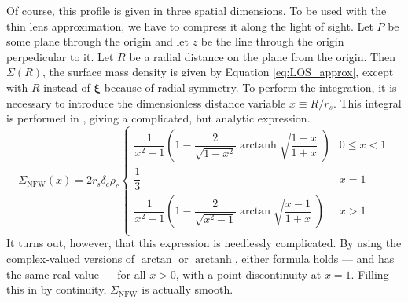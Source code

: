 \documentclass[10pt,twoside]{article}
\theoremstyle{definition}
\theoremstyle{exercise}
\renewcommand{\v}[1]{\boldsymbol{#1}}%
\DeclareMathOperator\arctanh{arctanh}
\begin{document}
Of course, this profile is given in three spatial dimensions. To be used with the thin lens approximation, we have to compress it along the light of sight. Let $P$ be some plane through the origin and let $z$ be the line through the origin perpedicular to it. Let $R$ be a radial distance on the plane from the origin. Then $\Sigma(R)$, the surface mass density is given by Equation \eqref{eq:LOS_approx}, except with $R$ instead of $\v{\xi}$ because of radial symmetry. To perform the integration, it is necessary to introduce the dimensionless distance variable $x \equiv R/r_s$. This integral is performed in \cite{brainerd_wright}, giving a complicated, but analytic expression.
\begin{equation}
		\Sigma_\text{NFW}(x) = 2r_s \delta_c \rho_c
		\begin{cases}
				\dfrac{1}{x^2-1}\left( 1-\dfrac{2}{\sqrt{1-x^2}} \arctanh \sqrt{\dfrac{1-x}{1+x}}\; \right) & 0 \le x < 1\\[1.2em]
				\dfrac{1}{3} & x=1\\[1.2em]
				\dfrac{1}{x^2-1}\left( 1-\dfrac{2}{\sqrt{x^2-1}} \arctan \sqrt{\dfrac{x-1}{1+x}}\; \right) &  x > 1\\
		\end{cases}
		\label{eq:NFW_surface_mass_density}
\end{equation}
It turns out, however, that this expression is needlessly complicated. By using the complex-valued versions of $\arctan$ or $\arctanh$, either formula holds --- and has the same real value --- for all $x > 0$, with a point discontinuity at $x =1$. Filling this in by continuity, $\Sigma_\text{NFW}$ is actually smooth.
\end{document}
